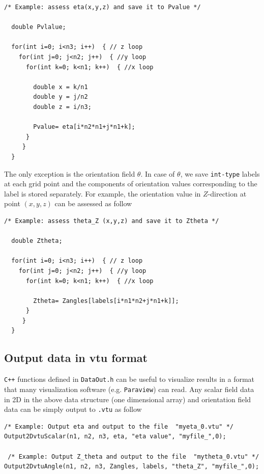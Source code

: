 \documentclass[11pt]{article}
\begin{document}
\begin{tcolorbox}
\begin{lstlisting}[basicstyle=\footnotesize]
  /* Example: assess eta(x,y,z) and save it to Pvalue */

  double Pvlalue;
 
  for(int i=0; i<n3; i++)  { // z loop
    for(int j=0; j<n2; j++)  { //y loop
      for(int k=0; k<n1; k++)  { //x loop
        
        double x = k/n1
        double y = j/n2
        double z = i/n3;
 
        Pvalue= eta[i*n2*n1+j*n1+k]; 
      }
     }
  }
\end{lstlisting}
\end{tcolorbox}

The only exception is the orientation field $\theta$.
In case of $\theta$, we save \texttt{int-type} labels at each grid point
and the components of orientation values corresponding to the label is stored separately. 
For example, the orientation value in $Z$-direction at point $(x,y,z)$ 
can be assessed as follow
\begin{tcolorbox}
\begin{lstlisting}[basicstyle=\footnotesize]
  /* Example: assess theta_Z (x,y,z) and save it to Ztheta */

  double Ztheta;
 
  for(int i=0; i<n3; i++)  { // z loop
    for(int j=0; j<n2; j++)  { //y loop
      for(int k=0; k<n1; k++)  { //x loop
        
        Ztheta= Zangles[labels[i*n1*n2+j*n1+k]];
      }
     }
  }
\end{lstlisting}
\end{tcolorbox}

\subsection{Output data in vtu format}

\texttt{C++} functions defined in \texttt{DataOut.h} can be useful 
to visualize results in a format that many visualization software (e.g. \texttt{Paraview}) 
can read. Any scalar field data in 2D in the above data structure (one dimensional array)
and orientation field data can be simply output to \texttt{.vtu} as follow 

\begin{tcolorbox}
\begin{lstlisting}[basicstyle=\footnotesize]
  /* Example: Output eta and output to the file  "myeta_0.vtu" */
Output2DvtuScalar(n1, n2, n3, eta, "eta value", "myfile_",0);

 /* Example: Output Z_theta and output to the file  "mytheta_0.vtu" */
Output2DvtuAngle(n1, n2, n3, Zangles, labels, "theta_Z", "myfile_",0); 
\end{lstlisting}
\end{tcolorbox}
\end{document}
